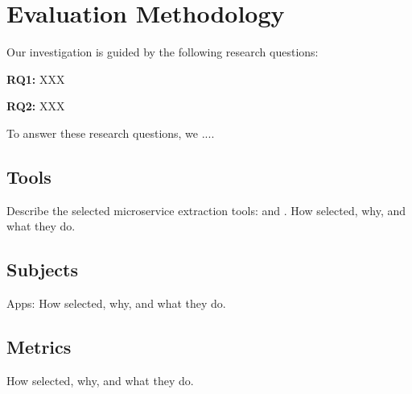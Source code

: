 \section{Evaluation Methodology}
\label{sec:eval}
Our investigation is guided by the following research questions:

\noindent 
{\bf RQ1:} XXX

\noindent 
{\bf RQ2:} XXX

To answer these research questions, we ....
 

\subsection{Tools}
Describe the selected microservice extraction tools: \bn and \fs. 
How selected, why, and what they do. 

\subsection{Subjects}

Apps: How selected, why, and what they do.

\subsection{Metrics}

How selected, why, and what they do.